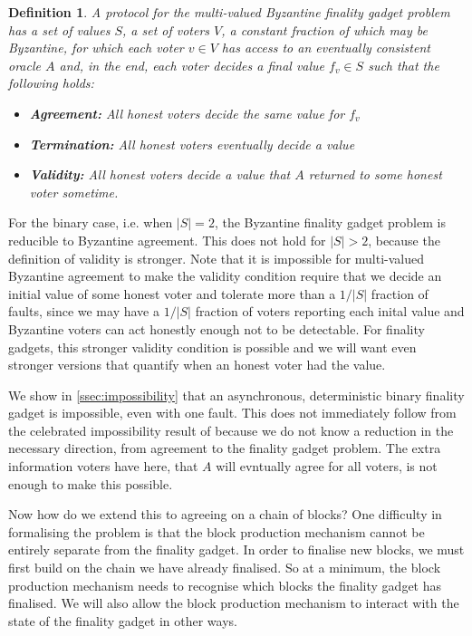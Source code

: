 \documentclass{article}
\newtheorem{definition}[theorem]{Definition}
\begin{document}
\begin{definition} A protocol for the {\em multi-valued Byzantine finality gadget problem} has a set of values $S$, a set of voters $V$, a constant fraction of which may be Byzantine, for which each voter $v \in V$ has access to an eventually consistent oracle $A$ and, in the end, each voter decides a final value $f_v \in S$ such that the following holds:

\begin{itemize}
\item {\bf Agreement:} All honest voters decide the same value for $f_v$
\item {\bf Termination:} All honest voters eventually decide a value
\item {\bf Validity:} All honest voters decide a value that $A$ returned to some honest voter sometime.
\end{itemize}

\end{definition}

For the binary case, i.e. when $|S|=2$, the Byzantine finality gadget problem is reducible to Byzantine agreement. This does not hold for $|S| > 2$, because the definition of validity is stronger. Note that it is impossible for multi-valued Byzantine agreement to make the validity condition require that we decide an initial value of some honest voter and tolerate more than a $1/|S|$ fraction of faults, since we may have a $1/|S|$ fraction of voters reporting each inital value and Byzantine voters can act honestly enough not to be detectable. For finality gadgets, this stronger validity condition is possible and we will want even stronger versions that quantify when an honest voter had the value.

We show in \ref{ssec:impossibility} that an asynchronous, deterministic binary finality gadget is impossible, even with one fault. This does not immediately follow from the celebrated impossibility result of \cite{flp} because we do not know a reduction in the necessary direction, from agreement to the finality gadget problem. The extra information voters have here, that $A$ will evntually agree for all voters, is not enough to make this possible.


Now how do we extend this to agreeing on a chain of blocks? One difficulty in formalising the problem is that the block production mechanism cannot be entirely separate from the finality gadget. In order to finalise new blocks, we must first build on the chain we have already finalised. So at a minimum, the block production mechanism needs to recognise which blocks the finality gadget has finalised. We will also allow the block production mechanism to interact with the state of the finality gadget in other ways.
\end{document}
